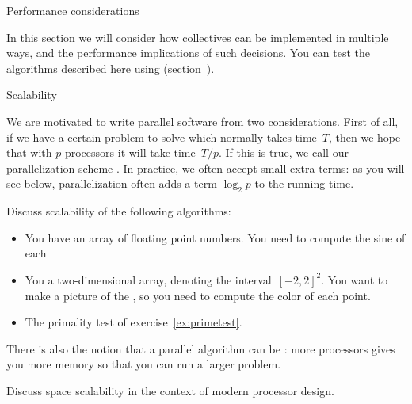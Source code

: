 
 {Performance considerations}

In this section we will consider how collectives can be implemented in
multiple ways, and the performance implications of such decisions.
You can test the algorithms described here using 
(section~).

 {Scalability}

We are motivated to write parallel software from two considerations.
First of all, if we have a certain problem to solve which normally
takes time~$T$, then we hope that with $p$ processors it will take time~$T/p$.
If this is true, we call our parallelization scheme .
In practice, we often accept small extra terms:
as you will see below, parallelization often adds a term $\log_2p$
to the running time.

\begin{exercise}
  Discuss scalability of the following algorithms:
  \begin{itemize}
  \item
    You have an array of floating point numbers.
    You need to compute the sine of each
  \item You a two-dimensional array, denoting the interval~$[-2,2]^2$.
    You want to make a picture of the ,
    so you need to compute the color of each point.
  \item The primality test of exercise~\ref{ex:primetest}.
  \end{itemize}
\end{exercise}

There is also the notion that a parallel algorithm can be
: more processors gives you more memory
so that you can run a larger problem.

\begin{exercise}
  Discuss space scalability in the context of modern processor design.
\end{exercise}

